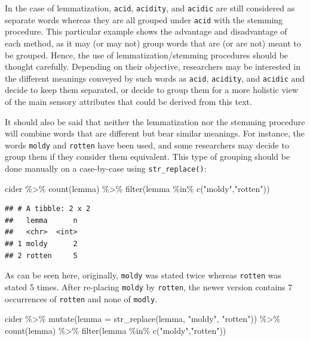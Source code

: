 \documentclass[
]{krantz}
\makeatletter
\newenvironment{Shaded}{\begin{snugshade}}{\end{snugshade}}
\newcommand{\AttributeTok}[1]{\textcolor[rgb]{0.61,0.61,0.61}{#1}}
\newcommand{\FunctionTok}[1]{\textcolor[rgb]{0,0,0}{#1}}
\newcommand{\NormalTok}[1]{#1}
\newcommand{\SpecialCharTok}[1]{\textcolor[rgb]{0,0,0}{#1}}
\newcommand{\StringTok}[1]{\textcolor[rgb]{0.5,0.5,0.5}{#1}}
\newenvironment{kframe}{%
\medskip{}
\setlength{\fboxsep}{.8em}
 \def\at@end@of@kframe{}%
 \ifinner\ifhmode%
  \def\at@end@of@kframe{\end{minipage}}%
  \begin{minipage}{\columnwidth}%
 \fi\fi%
 \def\FrameCommand##1{\hskip\@totalleftmargin \hskip-\fboxsep
 \colorbox{shadecolor}{##1}\hskip-\fboxsep
     \hskip-\linewidth \hskip-\@totalleftmargin \hskip\columnwidth}%
 \MakeFramed {\advance\hsize-\width
   \@totalleftmargin\z@ \linewidth\hsize
   \@setminipage}}%
 {\par\unskip\endMakeFramed%
 \at@end@of@kframe}
\renewenvironment{Shaded}{\begin{kframe}}{\end{kframe}}
\makeatother
\begin{document}
In the case of lemmatization, \texttt{acid}, \texttt{acidity}, and \texttt{acidic} are still considered as separate words whereas they are all grouped under \texttt{acid} with the stemming procedure. This particular example shows the advantage and disadvantage of each method, as it may (or may not) group words that are (or are not) meant to be grouped. Hence, the use of lemmatization/stemming procedures should be thought carefully. Depending on their objective, researchers may be interested in the different meanings conveyed by such words as \texttt{acid}, \texttt{acidity}, and \texttt{acidic} and decide to keep them separated, or decide to group them for a more holistic view of the main sensory attributes that could be derived from this text.

It should also be said that neither the lemmatization nor the stemming procedure will combine words that are different but bear similar meanings. For instance, the words \texttt{moldy} and \texttt{rotten} have been used, and some researchers may decide to group them if they consider them equivalent. This type of grouping should be done manually on a case-by-case using \texttt{str\_replace()}:

\begin{Shaded}
\begin{Highlighting}[]
\NormalTok{cider }\SpecialCharTok{\%\textgreater{}\%} 
  \FunctionTok{count}\NormalTok{(lemma) }\SpecialCharTok{\%\textgreater{}\%} 
  \FunctionTok{filter}\NormalTok{(lemma }\SpecialCharTok{\%in\%} \FunctionTok{c}\NormalTok{(}\StringTok{"moldy"}\NormalTok{,}\StringTok{"rotten"}\NormalTok{))}
\end{Highlighting}
\end{Shaded}

\begin{verbatim}
## # A tibble: 2 x 2
##   lemma      n
##   <chr>  <int>
## 1 moldy      2
## 2 rotten     5
\end{verbatim}

As can be seen here, originally, \texttt{moldy} was stated twice whereas \texttt{rotten} was stated 5 times. After re-placing \texttt{moldy} by \texttt{rotten}, the newer version contains 7 occurrences of \texttt{rotten} and none of \texttt{modly}.

\begin{Shaded}
\begin{Highlighting}[]
\NormalTok{cider }\SpecialCharTok{\%\textgreater{}\%} 
  \FunctionTok{mutate}\NormalTok{(}\AttributeTok{lemma =} \FunctionTok{str\_replace}\NormalTok{(lemma, }\StringTok{"moldy"}\NormalTok{, }\StringTok{"rotten"}\NormalTok{)) }\SpecialCharTok{\%\textgreater{}\%} 
  \FunctionTok{count}\NormalTok{(lemma) }\SpecialCharTok{\%\textgreater{}\%} 
  \FunctionTok{filter}\NormalTok{(lemma }\SpecialCharTok{\%in\%} \FunctionTok{c}\NormalTok{(}\StringTok{"moldy"}\NormalTok{,}\StringTok{"rotten"}\NormalTok{))}
\end{Highlighting}
\end{Shaded}
\end{document}
